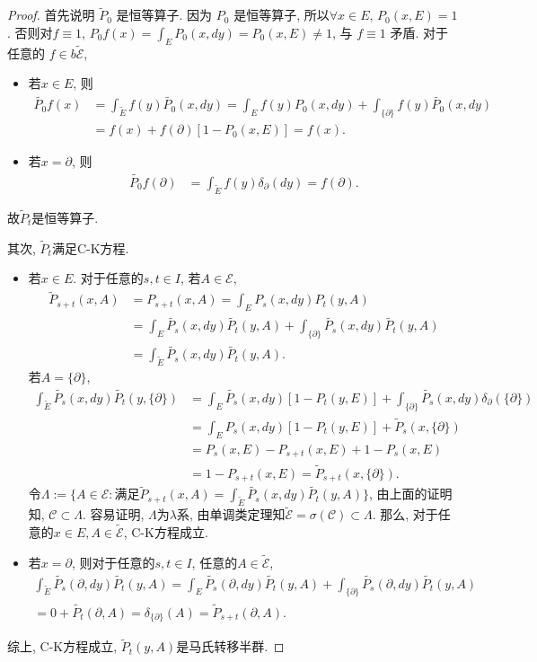 \documentclass[UTF8,ondside]{ctexart}
\newcommand{\h}{\mathscr}
\numberwithin{equation}{section}
\begin{document}
\begin{proof}
		首先说明 $\tilde P_0$ 是恒等算子. 因为 $P_0$ 是恒等算子, 所以$\forall x\in E$, $P_0(x,E)=1$. 否则对$f\equiv 1$, $P_0f(x)=\int_E P_0(x,dy)=P_0(x,E)\neq 1$, 与 $f\equiv 1$ 矛盾. 对于任意的 $f\in b \tilde{\h E}$,
		\begin{itemize}
			\item 若$x\in E$, 则
			\[\begin{aligned}
				\tilde{P_0} f(x)&=\int_{\tilde E} f(y)\tilde{P_0}(x,dy)=\int_E f(y)P_0(x,dy)+\int_{\{\partial\}} f(y)\tilde{P_0}(x,dy)\\
				&=f(x)+f(\partial)[1-P_0(x,E)]=f(x).
			\end{aligned}
			\]
			\item 若$x=\partial$, 则
			\[
				\begin{aligned}
					\tilde{P_0} f(\partial)&=\int_{\tilde E} f(y)\delta_{\partial}(dy)=f(\partial).
				\end{aligned}
			\]
		\end{itemize}
		故$\tilde P_t$是恒等算子. 

		其次, $\tilde P_t$满足C-K方程. 
		\begin{itemize}
			\item 若$x\in E$. 对于任意的$s,t\in I$, 若$A\in\h E$, 
			\[
				\begin{aligned}
					\tilde P_{s+t}(x,A)&=P_{s+t}(x,A)=\int_E P_s(x,dy)P_t(y,A)\\
					&=\int_E \tilde{P_s}(x,dy)\tilde{P_t}(y,A)+\int_{\{\partial\}}\tilde{P_s}(x,dy)\tilde{P_t}(y,A)\\
					&=\int_{\tilde E}\tilde{P_s}(x,dy)\tilde{P_t}(y,A).
				\end{aligned}
			\]
			若$A=\{\partial\}$,
			\[
				\begin{aligned}
					\int_{\tilde E} \tilde{P_s}(x,dy)\tilde{P_t}(y,\{\partial\})&=\int_{E} \tilde{P_s}(x,dy)[1-P_t(y,E)]+\int_{\{\partial\}} \tilde{P_s}(x,dy)\delta_\partial(\{\partial\})\\
					&=\int_{E} P_s(x,dy)[1-P_t(y,E)]+\tilde P_s(x,\{\partial\})\\
					&=P_s(x,E)-P_{s+t}(x,E)+1-P_s(x,E)\\
					&=1-P_{s+t}(x,E)=\tilde P_{s+t}(x,\{\partial\}).
				\end{aligned}
			\]
			令$\Lambda:=\{A\in\h E:\text{满足} \tilde P_{s+t}(x,A)=\int_{\tilde E}\tilde{P_s}(x,dy)\tilde{P_t}(y,A)\}$, 由上面的证明知, $\h C\subset \Lambda$. 容易证明, $\Lambda$为$\lambda$系, 由单调类定理知$\tilde{\h E}=\sigma(\h C)\subset\Lambda$. 那么, 对于任意的$x\in E,A\in\tilde{\h E}$, C-K方程成立.

			\item 若$x=\partial$, 则对于任意的$s,t\in I$, 任意的$A\in\tilde{\h E}$,
			\[
				\begin{aligned}
				\int_{\tilde{E}}\tilde{P_s}(\partial,dy)\tilde{P_t}(y,A)
				=\int_{E}\tilde{P_s}(\partial,dy)\tilde{P_t}(y,A)+\int_{\{\partial\}}\tilde{P_s}(\partial,dy)\tilde{P_t}(y,A)\\
				=0+\tilde{P_t}(\partial,A)=\delta_{\{\partial\}}(A)=\tilde P_{s+t} (\partial,A).
				\end{aligned}
			\]
		\end{itemize}
		综上, C-K方程成立, $\tilde P_t(y,A)$是马氏转移半群.
	\end{proof}
\end{document}
